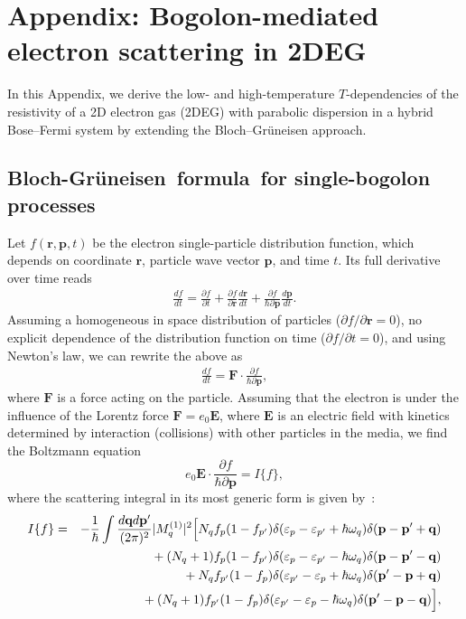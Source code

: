 \chapter{Appendix: Bogolon-mediated electron scattering in 2DEG}\label{AP:CH7}
In this Appendix, we derive the low- and high-temperature $T$-dependencies of the resistivity of a 2D electron gas (2DEG) with parabolic dispersion in a hybrid Bose--Fermi system by extending the Bloch--Gr\"uneisen approach.

%
%
\section[Bloch--Gr\"uneisen~formula~for single-bogolon processes]{Bloch-Gr\"uneisen~formula~for single-bogolon\\ processes}
%
Let $f(\mathbf{r},\mathbf{p},t)$ be the electron single-particle distribution function, which depends on coordinate $\mathbf{r}$, particle wave vector $\mathbf{p}$, and time $t$. Its full derivative over time reads
%
\begin{eqnarray}
\frac{df}{dt}=\frac{\partial f}{\partial t}+\frac{\partial f}{\partial \mathbf{r}}\frac{d\mathbf{r}}{dt}
+\frac{\partial f}{\hbar\partial \mathbf{p}}\frac{d\mathbf{p}}{dt}.
\end{eqnarray}
%
Assuming a homogeneous in space distribution of particles ($\partial f/\partial\mathbf{r}=0$), no explicit dependence of the distribution function on time ($\partial f/\partial t=0$), and using Newton's law, we can rewrite the above as
%
\begin{eqnarray}
\frac{df}{dt}=
\mathbf{F}\cdot
\frac{\partial f}{\hbar\partial \mathbf{p}},
\end{eqnarray}
%
where $\mathbf{F}$ is a force acting on the particle.
%
Assuming that the electron is under the influence of the Lorentz force $\mathbf{F}=e_0\mathbf{E}$, where $\mathbf{E}$ is an electric field with kinetics determined by interaction (collisions) with other particles in the media, we find
%
the Boltzmann equation
%
\begin{equation}\label{AP7_Eq1}
e_0\textbf{E}\cdot\frac{\partial f}{\hbar\partial \textbf{p}}=I\{f\},
\end{equation}
%
where the scattering integral in its most generic form is given by~\cite{Zaitsev:2014aa}:
%
\begin{eqnarray}
\label{AP7_Eq2}
I\{f\}&=&-\frac{1}{\hbar}\int\frac{d\textbf{q}d\textbf{p}'}{(2\pi)^2}|M^{(1)}_q|^2\Bigl[N_qf_p(1-f_{p'})\delta(\varepsilon_p-\varepsilon_{p'}+\hbar\omega_q)\delta(\textbf{p}-\textbf{p}'+\textbf{q})\nonumber\\
&{}&{}+(N_q+1)f_p(1-f_{p'})\delta(\varepsilon_p-\varepsilon_{p'}-\hbar\omega_q)\delta(\textbf{p}-\textbf{p}'-\textbf{q})\nonumber \\
&{}&{}+N_qf_{p'}(1-f_{p})\delta(\varepsilon_{p'}-\varepsilon_{p}+\hbar\omega_q)\delta(\textbf{p}'-\textbf{p}+\textbf{q})\nonumber\\
&{}&{}+(N_q+1)f_{p'}(1-f_p)\delta(\varepsilon_{p'}-\varepsilon_{p}-\hbar\omega_q)\delta(\textbf{p}'-\textbf{p}-\textbf{q})\Bigr],
\end{eqnarray}
